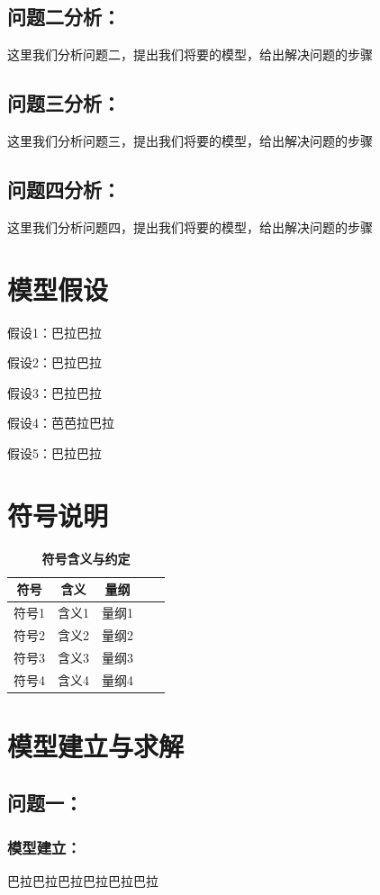 \documentclass[zihao=-4, UTF8]{article}		%
\theoremstyle{MyLineTheoremStyle} %
\theoremstyle{MyBlockTheoremStyle} %
\theoremstyle{MySubsubsectionStyle} %
\begin{document}
\subsection{问题二分析：}
这里我们分析问题二，提出我们将要的模型，给出解决问题的步骤
\subsection{问题三分析：}
这里我们分析问题三，提出我们将要的模型，给出解决问题的步骤
\subsection{问题四分析：}
这里我们分析问题四，提出我们将要的模型，给出解决问题的步骤

\section{模型假设}
假设1：巴拉巴拉\par
假设2：巴拉巴拉\par
假设3：巴拉巴拉\par
假设4：芭芭拉巴拉\par
假设5：巴拉巴拉

\section{符号说明}
\begin{table}[ht]
  \centering
  \caption{\textbf{符号含义与约定}}
  \label{tab:waterpump}
  \begin{tabular}{ccccc}
  \toprule
  符号 & 含义& 量纲\\
  \midrule
  符号1& 含义1& 量纲1\\
  符号2& 含义2& 量纲2\\
  符号3& 含义3& 量纲3\\
  符号4& 含义4& 量纲4\\
  \bottomrule
  \end{tabular}
\end{table}

\section{模型建立与求解}

\subsection{问题一：}
\subsubsection{模型建立：}
巴拉巴拉巴拉巴拉巴拉巴拉
\end{document}
